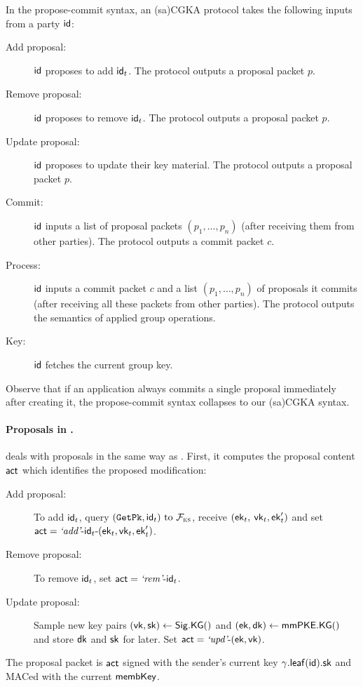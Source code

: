 In the propose-commit syntax, an (sa)CGKA protocol takes the following inputs from a party ${\mathsf{id}}$:
\begin{description}
	\item[Add proposal:] ${\mathsf{id}}$ proposes to add ${\mathsf{id}}_t$. The protocol outputs a proposal packet $p$.
	\item[Remove proposal:] ${\mathsf{id}}$ proposes to remove ${\mathsf{id}}_t$. The protocol outputs a proposal packet $p$.
	\item[Update proposal:] ${\mathsf{id}}$ proposes to update their key material. The protocol outputs a proposal packet $p$.
	\item[Commit:] ${\mathsf{id}}$ inputs a list of proposal packets $(p_1, \dots, p_n)$ (after receiving them from other parties). The protocol outputs a commit packet $c$.
	\item[Process:] ${\mathsf{id}}$ inputs a commit packet $c$ and a list $(p_1, \dots, p_n)$ of proposals it commits (after receiving all these packets from other parties). The protocol outputs the semantics of applied group operations.
	\item[Key:] ${\mathsf{id}}$ fetches the current group key.
\end{description}

Observe that if an application always commits a single proposal immediately after creating it, the propose-commit syntax collapses to our (sa)CGKA syntax.

\paragraph{Proposals in \saik.}
\saik deals with proposals in the same way as \protITK. First, it computes the proposal content $\mathsf{act}$ which identifies the proposed modification:
\begin{description}
	\item[Add proposal:] To add ${\mathsf{id}}_t$, query $({\normalfont\texttt{GetPk}},{\mathsf{id}}_t) \text{ to } \mathcal{F}_{\normalfont\textsc{ks}}$, receive $({\mathsf{ek}}_t, $ ${\mathsf{vk}}_t, {\mathsf{ek}}_t')$ and set $\mathsf{act} = {\text{\normalfont \it`add'}}\textrm{-}{\ensuremath{\mathsf{id}}}_t\textrm{-}({\mathsf{ek}}_t, {\mathsf{vk}}_t, {\mathsf{ek}}_t')$.
	\item[Remove proposal:] To remove ${\mathsf{id}}_t$, set $\mathsf{act} = {\text{\normalfont \it`rem'}}\textrm{-}{\ensuremath{\mathsf{id}}}_t$.
	\item[Update proposal:] Sample new key pairs  $({\mathsf{vk}}, {\mathsf{sk}}) \gets {\ensuremath{\mathsf{Sig}}}.{\mathsf{KG}}()$ and $({\mathsf{ek}}, {\mathsf{dk}}) \gets {\ensuremath{\mathsf{mmPKE}}}.{\mathsf{KG}}()$ and store ${\mathsf{dk}}$ and ${\mathsf{sk}}$ for later. Set $\mathsf{act} = {\text{\normalfont \it`upd'}}\textrm{-}({\mathsf{ek}}, {\mathsf{vk}})$.
\end{description}
The proposal packet is $\mathsf{act}$ signed with the sender's current key $\gamma.{\mathsf{leaf}}({\mathsf{id}}).{\mathsf{sk}}$ and MACed with the current ${\mathsf{membKey}}$.

